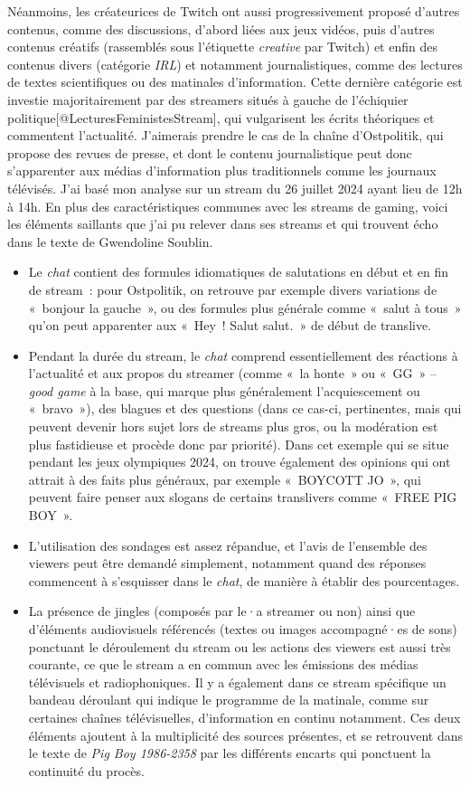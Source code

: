 \documentclass[
]{article}
\begin{document}
Néanmoins, les créateurices de Twitch ont aussi progressivement proposé d'autres contenus, comme des discussions, d'abord liées aux jeux vidéos, puis d'autres contenus créatifs (rassemblés sous l'étiquette \emph{creative} par Twitch) et enfin des contenus divers (catégorie \emph{IRL}) et notamment journalistiques, comme des lectures de textes scientifiques ou des matinales d'information. Cette dernière catégorie est investie majoritairement par des streamers situés à gauche de l'échiquier politique{[}@LecturesFeministesStream{]}, qui vulgarisent les écrits théoriques et commentent l'actualité. J'aimerais prendre le cas de la chaîne d'Ostpolitik, qui propose des revues de presse, et dont le contenu journalistique peut donc s'apparenter aux médias d'information plus traditionnels comme les journaux télévisés. J'ai basé mon analyse sur un stream du 26 juillet 2024 ayant lieu de 12h à 14h. En plus des caractéristiques communes avec les streams de gaming, voici les éléments saillants que j'ai pu relever dans ses streams et qui trouvent écho dans le texte de Gwendoline Soublin.

\begin{itemize}
\item
  Le \emph{chat} contient des formules idiomatiques de salutations en début et en fin de stream~: pour Ostpolitik, on retrouve par exemple divers variations de «~bonjour la gauche~», ou des formules plus générale comme «~salut à tous~» qu'on peut apparenter aux «~Hey~! Salut salut.~» de début de translive.
\item
  Pendant la durée du stream, le \emph{chat} comprend essentiellement des réactions à l'actualité et aux propos du streamer (comme «~la honte~» ou «~GG~» -- \emph{good game} à la base, qui marque plus généralement l'acquiescement ou «~bravo~»), des blagues et des questions (dans ce cas-ci, pertinentes, mais qui peuvent devenir hors sujet lors de streams plus gros, ou la modération est plus fastidieuse et procède donc par priorité). Dans cet exemple qui se situe pendant les jeux olympiques 2024, on trouve également des opinions qui ont attrait à des faits plus généraux, par exemple «~BOYCOTT JO~», qui peuvent faire penser aux slogans de certains translivers comme «~FREE PIG BOY~».
\item
  L'utilisation des sondages est assez répandue, et l'avis de l'ensemble des viewers peut être demandé simplement, notamment quand des réponses commencent à s'esquisser dans le \emph{chat}, de manière à établir des pourcentages.
\item
  La présence de jingles (composés par le·a streamer ou non) ainsi que d'éléments audiovisuels référencés (textes ou images accompagné·es de sons) ponctuant le déroulement du stream ou les actions des viewers est aussi très courante, ce que le stream a en commun avec les émissions des médias télévisuels et radiophoniques. Il y a également dans ce stream spécifique un bandeau déroulant qui indique le programme de la matinale, comme sur certaines chaînes télévisuelles, d'information en continu notamment. Ces deux éléments ajoutent à la multiplicité des sources présentes, et se retrouvent dans le texte de \emph{Pig Boy 1986-2358} par les différents encarts qui ponctuent la continuité du procès.
\end{itemize}
\end{document}
